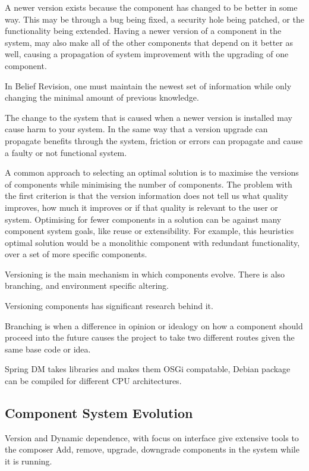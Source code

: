 A newer version exists because the component has changed to be better in some way.
This may be through a bug being fixed, a security hole being patched, or the functionality being extended.
Having a newer version of a component in the system, may also make all of the other components that depend on it better as well,
causing a propagation of system improvement with the upgrading of one component.

In Belief Revision, one must maintain the newest set of information while only changing the minimal amount of previous knowledge. 

The change to the system that is caused when a newer version is installed may cause harm to your system.
In the same way that a version upgrade can propagate benefits through the system, 
friction or errors can propagate and cause a faulty or not functional system.

A common approach to selecting an optimal solution is to
maximise the versions of components while minimising the number of components.
The problem with the first criterion is that the version information does not tell us what quality improves, 
how much it improves or if that quality is relevant to the user or system.
Optimising for fewer components in a solution can be against many component system goals, like reuse or extensibility.
For example, this heuristics optimal solution would be a monolithic component with redundant functionality, over 
a set of more specific components. 


Versioning is the main mechanism in which components evolve.
There is also branching, and environment specific altering.

Versioning components has significant research behind it.

Branching is when a difference in opinion or idealogy on how a component should proceed into the future
causes the project to take two different routes given the same base code or idea.

Spring DM takes libraries and makes them OSGi compatable, 
Debian package can be compiled for different CPU architectures.


\subsection{Component System Evolution}
Version and Dynamic dependence, with focus on interface give extensive tools to the composer 
Add, remove, upgrade, downgrade components in the system while it is running.

